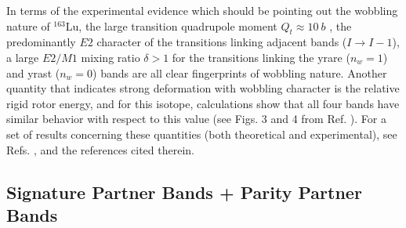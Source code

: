 \documentclass[myclassdoc,debug]{rjparticle}
\begin{document}
In terms of the experimental evidence which should be pointing out the wobbling nature of $^{163}$Lu, the large transition quadrupole moment $Q_t \approx 10\ b$ \cite{gorgen2004quadrupole}, the predominantly $E2$ character of the transitions linking adjacent bands ($I\to I-1$), a large $E2/M1$ mixing ratio $\delta>1$ for the transitions linking the yrare ($n_w=1$) and yrast ($n_w=0$) bands are all clear fingerprints of wobbling nature. Another quantity that indicates strong deformation with wobbling character is the relative rigid rotor energy, and for this isotope, calculations show that all four bands have similar behavior with respect to this value (see Figs. 3 and 4 from Ref. \cite{hagemann2005triaxiality}). For a set of results concerning these quantities (both theoretical and experimental), see Refs. \cite{raduta2017semiclassical,raduta2020new}, and the references cited therein. 

\subsection{Signature Partner Bands + Parity Partner Bands}
\label{subsection:w2}
\end{document}
